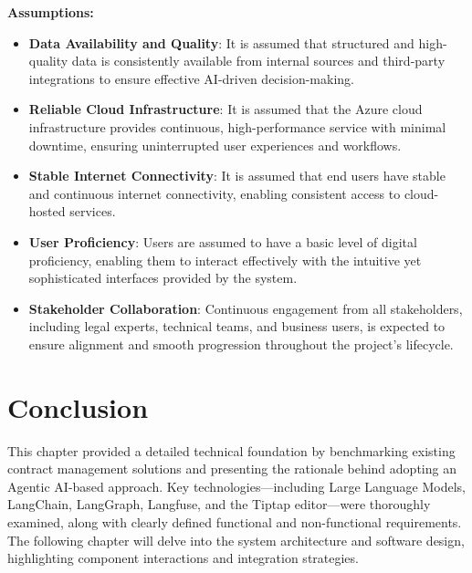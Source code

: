 \textbf{Assumptions:}
\begin{itemize}
    \item \textbf{Data Availability and Quality}: It is assumed that structured and high-quality data is consistently available from internal sources and third-party integrations to ensure effective AI-driven decision-making.
    \item \textbf{Reliable Cloud Infrastructure}: It is assumed that the Azure cloud infrastructure provides continuous, high-performance service with minimal downtime, ensuring uninterrupted user experiences and workflows.
    \item \textbf{Stable Internet Connectivity}: It is assumed that end users have stable and continuous internet connectivity, enabling consistent access to cloud-hosted services.
    \item \textbf{User Proficiency}: Users are assumed to have a basic level of digital proficiency, enabling them to interact effectively with the intuitive yet sophisticated interfaces provided by the system.
    \item \textbf{Stakeholder Collaboration}: Continuous engagement from all stakeholders, including legal experts, technical teams, and business users, is expected to ensure alignment and smooth progression throughout the project’s lifecycle.
\end{itemize}

\section{Conclusion}
This chapter provided a detailed technical foundation by benchmarking existing contract management solutions and presenting the rationale behind adopting an Agentic AI-based approach. Key technologies—including Large Language Models, LangChain, LangGraph, Langfuse, and the Tiptap editor—were thoroughly examined, along with clearly defined functional and non-functional requirements. The following chapter will delve into the system architecture and software design, highlighting component interactions and integration strategies.